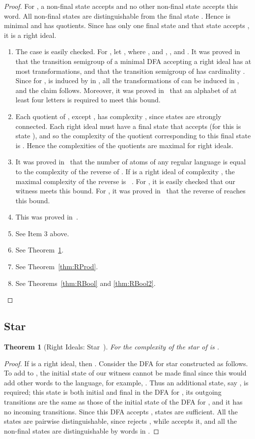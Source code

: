 \documentclass[final]{dmtcs-episciences}
\newcommand{\be}{\begin{enumerate}}
\newcommand{\ee}{\end{enumerate}}
\newtheorem{theorem}{Theorem}
\theoremstyle{definition}
\theoremstyle{remark}
\begin{document}
\begin{proof}
For , a non-final state  accepts  and no other non-final state accepts this word. All non-final states are distinguishable from the final state . Hence  is minimal and  has  quotients.
Since  has only one final state and that state accepts , it is a right ideal.
\be
\item
The case  is easily checked. For ,
let , where  , and
, ,  and 
.
It was proved in~\cite{BrYe11} that  the transition semigroup of a minimal DFA accepting a right ideal has at most  transformations, and that the transition semigroup of 
 has cardinality . 
Since for ,     is induced by   in ,
all the transformations of  can be induced in ,
and the claim follows.
Moreover, it was proved in~\cite{BSY15} that an alphabet of at least four letters is required to meet this bound. 


\item
Each quotient of , except , has complexity , since states  are strongly connected.
Each right ideal must have a final state that accepts  (for  this is state ), and so the complexity of the quotient corresponding to this final state is .
Hence the complexities of the quotients are maximal for right ideals.
\item
It was proved  in~\cite{BrTa13} that the number of atoms of any regular language  is equal to the complexity of the reverse of .
If  is a right ideal of complexity , the maximal complexity of the reverse  is 
~\cite{BJL13}.
For , it is easily checked that our witness meets this bound.
For , it was proved in~\cite{BrYe11} that the reverse of  reaches this bound.
\item
This was proved in~\cite{BrDa15}.
\item
See Item 3 above.
\item
See Theorem~\ref{thm:RStar}.
\item
See Theorem~\ref{thm:RProd}.
\item
See Theorems~\ref{thm:RBool} and \ref{thm:RBool2}.  
\ee
\end{proof}

\subsection{Star}
\begin{theorem}[Right Ideals: Star~\cite{BrDa14}]
\label{thm:RStar}
For  the complexity of the  star of  is .
\end{theorem}
\begin{proof}
If  is a right ideal, then .
Consider the DFA for star constructed as follows.
To add  to , 
the initial state  of our witness cannot be made final since this would add other words to the language, for example, .
Thus an additional state, say , is required; this state is both initial and final in the DFA for , its outgoing transitions are the same as those of the initial state  of the DFA for , and it has no incoming transitions. Since this DFA accepts ,  states are sufficient. All the states are pairwise distinguishable, since  rejects , while  accepts it, and all the non-final states are distinguishable by words in . 
\end{proof}
\end{document}
